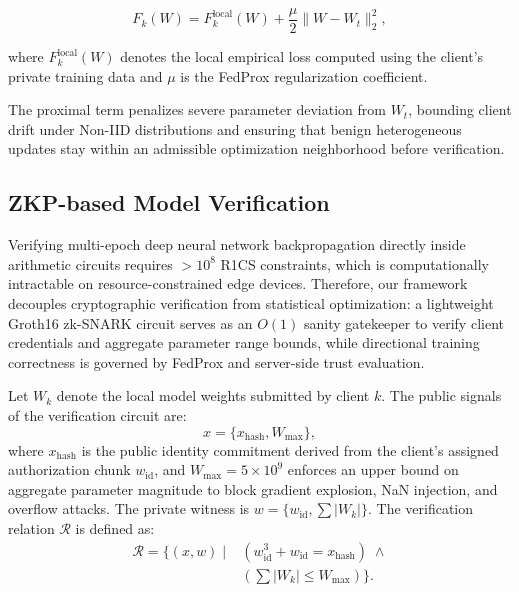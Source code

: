 \documentclass[conference, a4paper]{IEEEtran}
\begin{document}
\begin{equation}
    F_k(W) = F_k^{\mathrm{local}}(W)
    + \frac{\mu}{2}\lVert W-W_t\rVert_2^2,
\end{equation}

where $F_k^{\mathrm{local}}(W)$ denotes the local empirical loss computed using the client's private training data and $\mu$ is the FedProx regularization coefficient. 

The proximal term penalizes severe parameter deviation from $W_t$, bounding client drift under Non-IID distributions and ensuring that benign heterogeneous updates stay within an admissible optimization neighborhood before verification.

\subsection{ZKP-based Model Verification}

Verifying multi-epoch deep neural network backpropagation directly inside arithmetic circuits requires $>10^8$ R1CS constraints, which is computationally intractable on resource-constrained edge devices. Therefore, our framework decouples cryptographic verification from statistical optimization: a lightweight Groth16 zk-SNARK circuit serves as an $O(1)$ sanity gatekeeper to verify client credentials and aggregate parameter range bounds, while directional training correctness is governed by FedProx and server-side trust evaluation.

Let $W_k$ denote the local model weights submitted by client $k$. The public signals of the verification circuit are:
\begin{equation}
    x = \{x_{\mathrm{hash}}, W_{\max}\},
\end{equation}
where $x_{\mathrm{hash}}$ is the public identity commitment derived from the client's assigned authorization chunk $w_{\mathrm{id}}$, and $W_{\max} = 5 \times 10^9$ enforces an upper bound on aggregate parameter magnitude to block gradient explosion, NaN injection, and overflow attacks. The private witness is $w = \{w_{\mathrm{id}}, \sum |W_k|\}$. The verification relation $\mathcal{R}$ is defined as:
\begin{align}
    \mathcal{R} = \bigl\{(x, w) \;\big|\; &(w_{\mathrm{id}}^3 + w_{\mathrm{id}} = x_{\mathrm{hash}}) \;\land \nonumber \\
    &\left(\textstyle\sum |W_k| \le W_{\max}\right)\bigr\}.
    \label{eq:zkp_relation}
\end{align}
\end{document}
